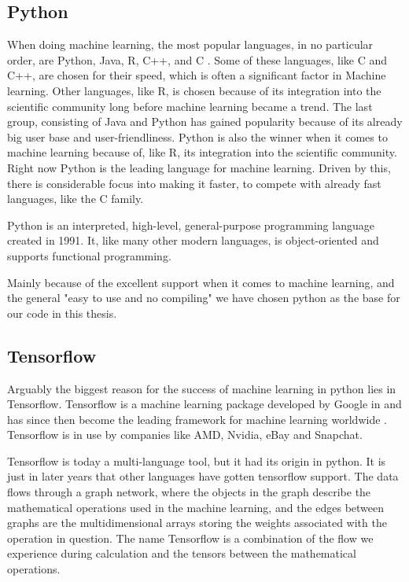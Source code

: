 \subsection{Python}
When doing machine learning, the most popular languages, in no particular order, are Python, Java, R, C++, and C . Some of these languages, like C and C++, are chosen for their speed, which is often a significant factor in Machine learning. Other languages, like R, is chosen because of its integration into the scientific community long before machine learning became a trend. The last group, consisting of Java and Python has gained popularity because of its already big user base and user-friendliness. Python is also the winner when it comes to machine learning because of, like R, its integration into the scientific community. 
Right now Python is the leading language for machine learning. Driven by this, there is considerable focus into making it faster, to compete with already fast languages, like the C family. 

Python is an interpreted, high-level, general-purpose programming language created in 1991.   It, like many other modern languages, is object-oriented and supports functional programming. 

Mainly because of the excellent support when it comes to machine learning, and the general "easy to use and no compiling" we have chosen python as the base for our code in this thesis. 



\subsection{Tensorflow}
Arguably the biggest reason for the success of machine learning in python lies in Tensorflow. Tensorflow is a machine learning package developed by Google in  and has since then become the leading framework for machine learning worldwide .  
Tensorflow is in use by companies like AMD, Nvidia, eBay and Snapchat. 



Tensorflow is today a multi-language tool, but it had its origin in python. It is just in later years that other languages have gotten tensorflow support.  
The data flows through a graph network, where the objects in the graph describe the mathematical operations used in the machine learning, and the edges between graphs are the multidimensional arrays storing the weights associated with the operation in question. The name Tensorflow is a combination of the flow we experience during calculation and the tensors between the mathematical operations. 


